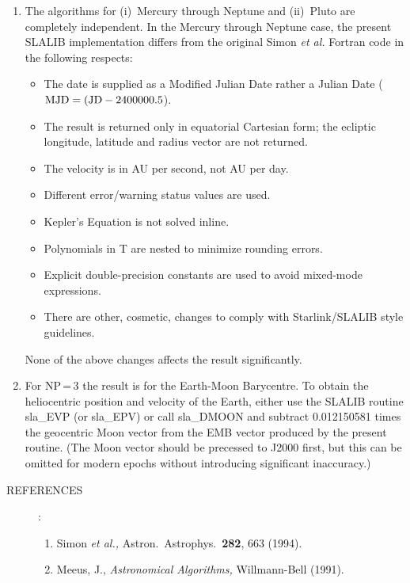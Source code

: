 \documentclass[11pt,twoside]{article}
\newlength{\oldspacing}
\newcommand{\refs}[1]
{
  \goodbreak
  \setlength{\oldspacing}{\topsep}
  \setlength{\topsep}{0.3ex}
  \begin{description}
    \item[REFERENCES]:
        #1
  \end{description}
  \setlength{\topsep}{\oldspacing}
}
\newcommand{\refs}[1]
   {
     \begin{description}
       \item[REFERENCES:]
           #1
     \end{description}
   }
\begin{document}
{\begin{enumerate}
        For all except Pluto, over the period 1000-3000,
        the accuracy is better than 1.5
        times that over 1800-2200.  Outside the interval 1000-3000 the
        accuracy declines.  For Pluto the accuracy declines rapidly
        outside the period 1885-2099.  Outside these ranges
        (1885-2099 for Pluto, 1000-3000 for the rest) a ``date out
        of range'' warning status ({\tt JSTAT=+1}) is returned.
  \item The algorithms for (i)~Mercury through Neptune and
        (ii)~Pluto are completely independent.  In the Mercury
        through Neptune case, the present SLALIB
        implementation differs from the original
        Simon {\it et al.}\/ Fortran code in the following respects:
        \begin{itemize}
         \item The date is supplied as a Modified Julian Date rather
               a Julian Date (${\rm MJD} = ({\rm JD} - 2400000.5$).
         \item The result is returned only in equatorial
               Cartesian form;  the ecliptic
               longitude, latitude and radius vector are not returned.
         \item The velocity is in AU per second, not AU per day.
         \item Different error/warning status values are used.
         \item Kepler's Equation is not solved inline.
         \item Polynomials in T are nested to minimize rounding errors.
         \item Explicit double-precision constants are used to avoid
               mixed-mode expressions.
         \item There are other, cosmetic, changes to comply with
               Starlink/SLALIB style guidelines.
        \end{itemize}
        None of the above changes affects the result significantly.
  \item For NP\,=\,3 the result is for the Earth-Moon Barycentre.  To
        obtain the heliocentric position and velocity of the Earth,
        either use the SLALIB routine sla\_EVP (or sla\_EPV)
        or call sla\_DMOON and
        subtract 0.012150581 times the geocentric Moon vector from
        the EMB vector produced by the present routine.  (The Moon
        vector should be precessed to J2000 first, but this can
        be omitted for modern epochs without introducing significant
        inaccuracy.)
 \end{enumerate}
\refs
{
 \begin{enumerate}
  \item Simon {\it et al.,}\/
        Astron.\ Astrophys.\ {\bf 282}, 663 (1994).
  \item Meeus, J.,
        {\it Astronomical Algorithms,}\/ Willmann-Bell (1991).
 \end{enumerate}
}
}
\end{document}
